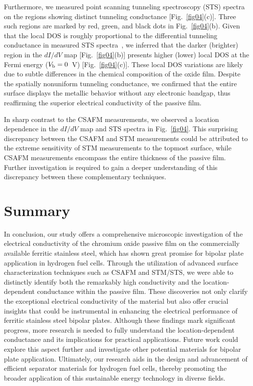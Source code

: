 \documentclass[jkps,reprint,twocolumn,showkeys]{revtex4}
\begin{document}
Furthermore, we measured point scanning tunneling spectroscopy (STS) spectra on the regions showing distinct tunneling conductance [Fig.~\ref{fig04}(c)].
Three such regions are marked by red, green, and black dots in Fig.~\ref{fig04}(b).
Given that the local DOS is roughly proportional to the differential tunneling conductance in measured STS spectra~\cite{feenstra1994ScanningTunnelingSpectroscopy}, we inferred that the darker (brighter) region in the $dI/dV$ map [Fig.~\ref{fig04}(b)] presents higher (lower) local DOS at the Fermi energy ($V_{\rm b} = 0$~V) [Fig.~\ref{fig04}(c)]. 
These local DOS variations are likely due to subtle differences in the chemical composition of the oxide film.
Despite the spatially nonuniform tunneling conductance, we confirmed that the entire surface displays the metallic behavior without any electronic bandgap, thus reaffirming the superior electrical conductivity of the passive film. 

In sharp contrast to the CSAFM measurements, we observed a location dependence in the $dI/dV$ map and STS spectra in Fig.~\ref{fig04}.
This surprising discrepancy between the CSAFM and STM measurements could be attributed to the extreme sensitivity of STM measurements to the topmost surface, while CSAFM measurements encompass the entire thickness of the passive film.
Further investigation is required to gain a deeper understanding of this discrepancy between these complementary techniques.

\section{Summary}
In conclusion, our study offers a comprehensive microscopic investigation of the electrical conductivity of the chromium oxide passive film on the commercially available ferritic stainless steel, which has shown great promise for bipolar plate application in hydrogen fuel cells. 
Through the utilization of advanced surface characterization techniques such as CSAFM and STM/STS, we were able to distinctly identify both the remarkably high conductivity and the location-dependent conductance within the passive film.
These discoveries not only clarify the exceptional electrical conductivity of the material but also offer crucial insights that could be instrumental in enhancing the electrical performance of ferritic stainless steel bipolar plates. 
Although these findings mark significant progress, more research is needed to fully understand the location-dependent conductance and its implications for practical applications. 
Future work could explore this aspect further and investigate other potential materials for bipolar plate application. 
Ultimately, our research aids in the design and advancement of efficient separator materials for hydrogen fuel cells, thereby promoting the broader application of this sustainable energy technology in diverse fields.
\end{document}
